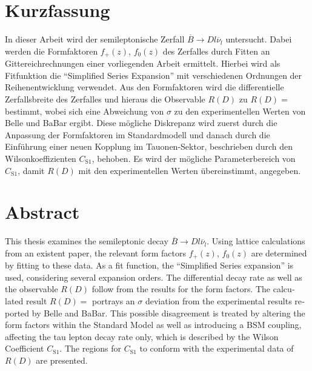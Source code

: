 \thispagestyle{plain}

\section*{Kurzfassung}
In dieser Arbeit wird der semileptonische Zerfall $\overline{B} \to D l \overline{\nu}_l$ untersucht.
Dabei werden die Formfaktoren $f_+(z)$, $f_0(z)$ des Zerfalles durch Fitten an Gittereichrechnungen einer vorliegenden Arbeit ermittelt.
Hierbei wird als Fitfunktion die \enquote{Simplified Series Expansion} mit verschiedenen Ordnungen der Reihenentwicklung verwendet.
Aus den Formfaktoren wird die differentielle Zerfallsbreite des Zerfalles und hieraus die Observable $R(D)$ zu $R(D) = $ bestimmt, wobei sich eine Abweichung von $\sigma$ zu den experimentellen Werten von Belle und BaBar ergibt.
Diese mögliche Diskrepanz wird zuerst durch die Anpassung der Formfaktoren im Standardmodell und danach durch die Einführung einer neuen Kopplung im Tauonen-Sektor, beschrieben durch den Wilsonkoeffizienten $C_{\text{S}1}$, behoben.
Es wird der mögliche Parameterbereich von $C_{\text{S}1}$, damit $R(D)$ mit den experimentellen Werten übereinstimmt, angegeben.


\section*{Abstract}
\begin{english}
This thesis examines the semileptonic decay $\overline{B} \to D l \overline{\nu}_l$.
Using lattice calculations from an existent paper, the relevant form factors $f_+(z)$, $f_0(z)$ are determined by fitting to these data.
As a fit function, the \enquote{Simplified Series expansion} is used, considering several expansion orders.
The differential decay rate as well as the observable $R(D)$ follow from the results for the form factors.
The calculated result $R(D) = $ portrays an $\sigma$ deviation from the experimental results reported by Belle and BaBar.
This possible disagreement is treated by altering the form factors within the Standard Model as well as introducing a BSM coupling, affecting the tau lepton decay rate only, which is described by the Wilson Coefficient $C_{\text{S}1}$.
The regions for $C_{\text{S}1}$ to conform with the experimental data of $R(D)$ are presented.
\end{english}
